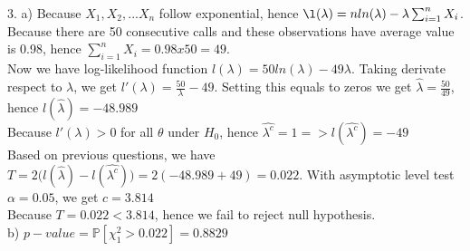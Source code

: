 \documentclass[10pt]{article}
\newenvironment{problem}[2][Problem]{\begin{trivlist}
\item[\hskip \labelsep {\bfseries #1}\hskip \labelsep {\bfseries #2.}]}{\end{trivlist}}
\begin{document}
\begin{problem}{1}
\item 3.
a) Because $X_1, X_2,...X_n$ follow exponential, hence $\l(\lambda)=nln(\lambda)- \lambda \sum_{i=1}^{n}X_i$. Because there are 50 consecutive calls and these observations have average value is 0.98, hence $ \sum_{i=1}^{n}X_i=0.98x50=49$.\\
Now we have log-likelihood function $l(\lambda)=50ln(\lambda)- 49\lambda$. Taking derivate respect to $\lambda$, we get $l'(\lambda)= \frac{50}{\lambda}-49$. Setting this equals to zeros we get $\hat{\lambda}=\frac{50}{49}$, hence $l(\hat{\lambda})=-48.989$\\
Because $l'(\lambda) > 0$ for all $\theta$ under $H_0$, hence $\hat{\lambda^c}=1 => l(\hat{\lambda^c})=-49$\\
Based on previous questions, we have $T=2\Big(l(\hat{\lambda})-l(\hat{\lambda^c})\Big)= 2(-48.989+49)=0.022$. With asymptotic level test $\alpha=0.05$, we get $c=3.814$\\
Because $T=0.022<3.814$, hence we fail to reject null hypothesis.\\
b) $p-value=\mathbb{P}[\chi_{1}^{2}>0.022]=0.8829$




















\end{problem}
\end{document}
